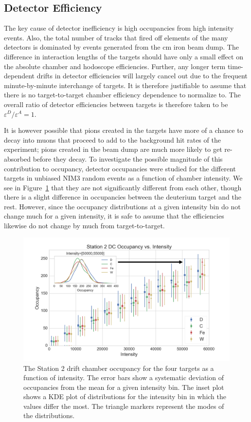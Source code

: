 \subsection{Detector Efficiency}

The key cause of detector inefficiency is high occupancies from high intensity events. Also, the total number of tracks that fired off elements of the many detectors is dominated by events generated from the \unit[503]{cm} iron beam dump. The difference in interaction lengths of the targets should have only a small effect on the absolute chamber and hodoscope efficiencies. Further, any longer term time-dependent drifts in detector efficiencies will largely cancel out due to the frequent minute-by-minute interchange of targets. It is therefore justifiable to assume that there is no target-to-target chamber efficiency dependence to normalize to. The overall ratio of detector efficiencies between targets is therefore taken to be $\varepsilon^D/\varepsilon^A=1$. 

It is however possible that pions created in the targets have more of a chance to decay into muons that proceed to add to the background hit rates of the experiment; pions created in the beam dump are much more likely to get re-absorbed before they decay. To investigate the possible magnitude of this contribution to occupancy, detector occupancies were studied for the different targets in unbiased NIM3 random events as a function of chamber intensity. We see in Figure~\ref{fig:occ-int-targ} that they are not significantly different from each other, though there is a slight difference in occupancies between the deuterium target and the rest. However, since the occupancy distributions at a given intensity bin do not change much for a given intensity, it is safe to assume that the efficiencies likewise do not change by much from target-to-target.
\begin{figure}
	\centering
	\includegraphics[width=5in]{figures/analysis/targ-occupancy.png}
	\caption{The Station 2 drift chamber occupancy for the four targets as a function of intensity. The error bars show a systematic deviation of occupancies from the mean for a given intensity bin. The inset plot shows a KDE plot of distributions for the intensity bin in which the values differ the most. The triangle markers represent the modes of the distributions.}
	\label{fig:occ-int-targ}
\end{figure}

